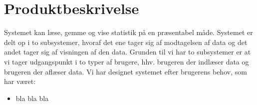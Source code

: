 \section*{Produktbeskrivelse}
Systemet kan læse, gemme og vise statistik på en præsentabel måde. Systemet er delt op i to subsystemer, hvoraf det ene tager sig af modtagelsen af data og det andet tager sig af visningen af den data.
Grunden til vi har to subsystemer er at vi tager udgangspunkt i to typer af brugere, 
hhv. brugeren der indlæser data og brugeren der aflæser data.
Vi har designet systemet efter brugerens behov, som har været:
\begin{itemize}
    \item bla bla bla
\end{itemize}
